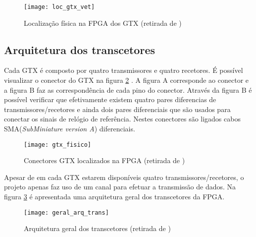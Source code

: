 \begin{figure}[h!]
	\begin{center}
		\leavevmode
		\texttt{[image: loc\_gtx\_vet]}
		\caption[Localização física na FPGA dos GTX]{Localização física na FPGA dos GTX (retirada de \cite{R008})}
		\label{fig:loc_gtx}
	\end{center}
\end{figure}

\subsection{Arquitetura dos transcetores} \label{sub:arqGTX}

Cada GTX é composto por quatro transmissores e quatro recetores. É possível visualizar o conector do GTX na figura \ref{fig:gtx_fis} . A figura A corresponde ao conector e a figura B faz as correspondência de cada pino do conector. Através da figura B é possível verificar que efetivamente existem quatro pares diferencias de transmissores/recetores e ainda dois pares diferenciais que são usados para conectar os sinais de relógio de referência. Nestes conectores são ligados cabos SMA(\textit{SubMiniature version A}) diferenciais.

\begin{figure}[h!]
	\begin{center}
		\leavevmode
		\texttt{[image: gtx\_fisico]}
		\caption[Conectores GTX localizados na FPGA]{Conectores GTX localizados na FPGA (retirada de \cite{R008})}
		\label{fig:gtx_fis}
	\end{center}
\end{figure}

Apesar de em cada GTX estarem disponíveis quatro transmissores/recetores, o projeto apenas faz uso de um canal para efetuar a transmissão de dados. Na figura \ref{fig:gtx_geral_arq} é apresentada uma arquitetura geral dos transcetores da FPGA.

\begin{figure}[h!]
	\begin{center}
		\leavevmode
		\texttt{[image: geral\_arq\_trans]}
		\caption[Arquitetura geral dos transcetores]{Arquitetura geral dos transcetores (retirada de \cite{R010})}
		\label{fig:gtx_geral_arq}
	\end{center}
\end{figure}


